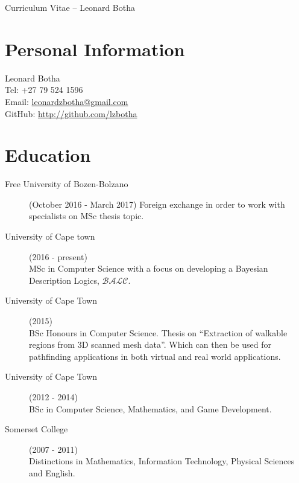 \documentclass[margin,line,a4paper]{resume}
\begin{document}
    {\sc \Large Curriculum Vitae -- Leonard Botha}
    \begin{resume}
        \vspace{0.5cm}

        \section{\mysidestyle Personal Information}
            Leonard Botha\\
            Tel: +27 79 524 1596\\
            Email: \href{mailto:leonardzbotha@gmail.com}{leonardzbotha@gmail.com}\\
            GitHub: \href{http://github.com/lzbotha}{http://github.com/lzbotha}\\

        \section{\mysidestyle Education}
            \begin{description}
                \item[Free University of Bozen-Bolzano] (October 2016 - March 2017)
                    Foreign exchange in order to work with specialists on MSc thesis topic.

                \item[University of Cape town] (2016 - present)\\
                    MSc in Computer Science with a focus on developing a Bayesian Description Logics, $\mathcal{BALC}$.

                \item[University of Cape Town] (2015) \\
                    BSc Honours in Computer Science. Thesis on ``Extraction of  walkable regions from 3D scanned mesh data''.
                    Which can then be used for pathfinding applications in both virtual and real world applications.

                \item[University of Cape Town] (2012 - 2014) \\
                    BSc in Computer Science, Mathematics, and Game Development.

                \item[Somerset College](2007 - 2011)\\
                    Distinctions in Mathematics, Information Technology, Physical Sciences and English.
            \end{description}



\end{resume}
\end{document}

